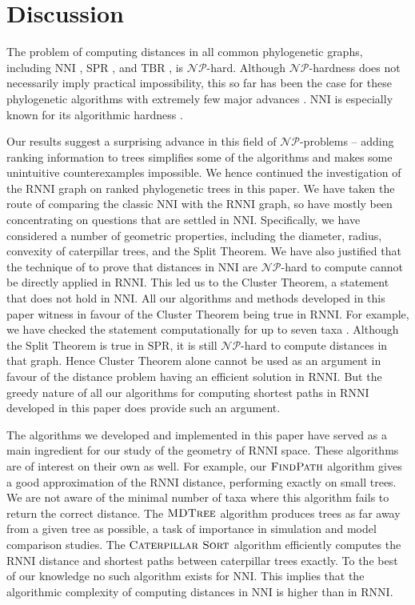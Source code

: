 \documentclass{amsart}
\newcommand{\np}{\mathcal{NP}}
\newcommand{\nni}{\mathrm{NNI}}
\newcommand{\rnni}{\mathrm{RNNI}}
\newcommand{\tbr}{\mathrm{TBR}}
\newcommand{\spr}{\mathrm{SPR}}
\newcommand{\csort}{\textsc{Caterpillar Sort}}
\newcommand{\findpath}{\textsc{FindPath}}
\newcommand{\mdtree}{\textsc{MDTree}}
\begin{document}
\section{Discussion}

The problem of computing distances in all common phylogenetic graphs, including $\nni$ \autocite{Dasgupta2000-xa}, $\spr$ \autocite{Bordewich2005-nx}, and $\tbr$ \autocite{Allen2001-ky}, is $\np$-hard.
Although $\np$-hardness does not necessarily imply practical impossibility, this so far has been the case for these phylogenetic algorithms with extremely few major advances \autocite{Whidden2010-bw}.
$\nni$ is especially known for its algorithmic hardness \autocite{Whidden2018-fw}.

Our results suggest a surprising advance in this field of $\np$-problems -- adding ranking information to trees simplifies some of the algorithms and makes some unintuitive counterexamples impossible.
We hence continued the investigation of the $\rnni$ graph on ranked phylogenetic trees in this paper.
We have taken the route of comparing the classic $\nni$ with the $\rnni$ graph, so have mostly been concentrating on questions that are settled in $\nni$.
Specifically, we have considered a number of geometric properties, including the diameter, radius, convexity of caterpillar trees, and the Split Theorem.
We have also justified that the technique of \textcite{Dasgupta2000-xa} to prove that distances in $\nni$ are $\np$-hard to compute cannot be directly applied in $\rnni$.
This led us to the Cluster Theorem, a statement that does not hold in $\nni$.
All our algorithms and methods developed in this paper witness in favour of the Cluster Theorem being true in $\rnni$.
For example, we have checked the statement computationally for up to seven taxa \autocite{Collienne2019}.
Although the Split Theorem is true in $\spr$, it is still $\np$-hard to compute distances in that graph.
Hence Cluster Theorem alone cannot be used as an argument in favour of the distance problem having an efficient solution in $\rnni$.
But the greedy nature of all our algorithms for computing shortest paths in $\rnni$ developed in this paper does provide such an argument.

The algorithms we developed and implemented in this paper have served as a main ingredient for our study of the geometry of $\rnni$ space.
These algorithms are of interest on their own as well.
For example, our $\findpath$ algorithm gives a good approximation of the $\rnni$ distance, performing exactly on small trees.
We are not aware of the minimal number of taxa where this algorithm fails to return the correct distance.
The $\mdtree$ algorithm produces trees as far away from a given tree as possible, a task of importance in simulation and model comparison studies.
The $\csort$ algorithm efficiently computes the $\rnni$ distance and shortest paths between caterpillar trees exactly.
To the best of our knowledge no such algorithm exists for $\nni$.
This implies that the algorithmic complexity of computing distances in $\nni$ is higher than in $\rnni$.
\end{document}
